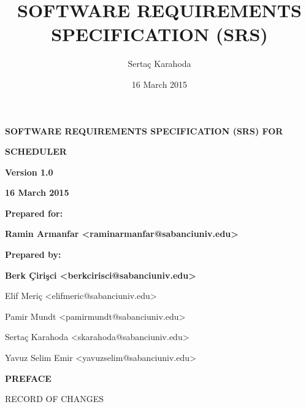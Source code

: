 \documentclass[twoside,letterpaper]{article}
\title{SOFTWARE REQUIREMENTS SPECIFICATION (SRS)}
\author{Serta\c{c} Karahoda}
\date{16 March 2015}
\begin{document}
\setcounter{page}{1}\pagestyle{Preface}

\vspace*{1.5in}
{\centering{}\bfseries\color{black}
SOFTWARE REQUIREMENTS SPECIFICATION (SRS) FOR 
\par}

\bigskip

{\centering{}\bfseries\color{black}
SCHEDULER
\par}


\bigskip


\bigskip


\bigskip


\bigskip

{\centering{}\bfseries\color{black}
Version 1.0
\par}

{\centering{}\bfseries\color{black}
16 March 2015
\par}


\bigskip


\bigskip

{\centering{}\bfseries\color{black}
Prepared for:
\par}

{\centering{}\bfseries\color{black}
Ramin Armanfar <raminarmanfar@sabanciuniv.edu>

\par}


\bigskip


\bigskip

{\centering{}\bfseries\color{black}
Prepared by:
\par}

{\centering{}\bfseries\color{black}
Berk \c{C}iri\c{s}ci <berkcirisci@sabanciuniv.edu>

Elif Meri\c{c} <elifmeric@sabanciuniv.edu>

Pamir Mundt <pamirmundt@sabanciuniv.edu>

Serta\c{c} Karahoda <skarahoda@sabanciuniv.edu>

Yavuz Selim Emir <yavuzselim@sabanciuniv.edu>
\par}



\bigskip

{\centering{}\bfseries\color{black}
PREFACE

\smallskip

RECORD OF CHANGES
\par}
\end{document}
